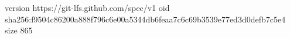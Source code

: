 version https://git-lfs.github.com/spec/v1
oid sha256:f9504c86200a888f796c6e00a5344db6feaa7c6c69b3539e77ed3d0defb7c5e4
size 865
